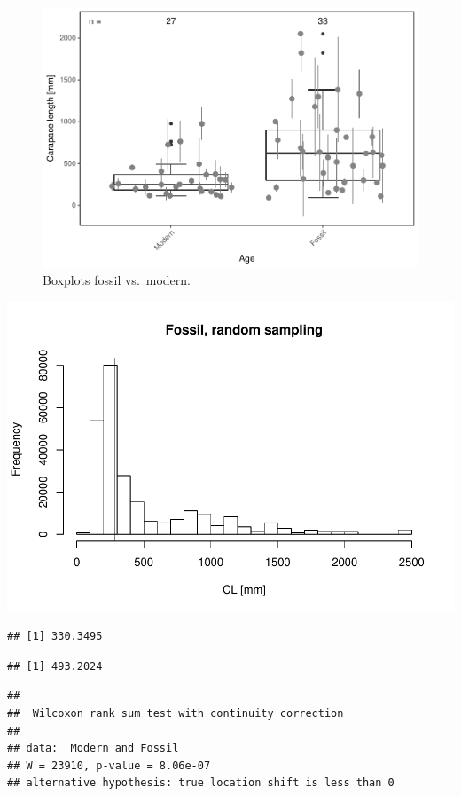 \documentclass[]{article}
\begin{document}
\begin{figure}[htbp]
\centering
\includegraphics{MA_JJ_files/figure-latex/BPMF-1.pdf}
\caption{Boxplots fossil vs.~modern.}
\end{figure}

\includegraphics{MA_JJ_files/figure-latex/RSFM-1.pdf}

\begin{verbatim}
## [1] 330.3495
\end{verbatim}

\begin{verbatim}
## [1] 493.2024
\end{verbatim}

\begin{verbatim}
## 
##  Wilcoxon rank sum test with continuity correction
## 
## data:  Modern and Fossil
## W = 23910, p-value = 8.06e-07
## alternative hypothesis: true location shift is less than 0
\end{verbatim}
\end{document}
